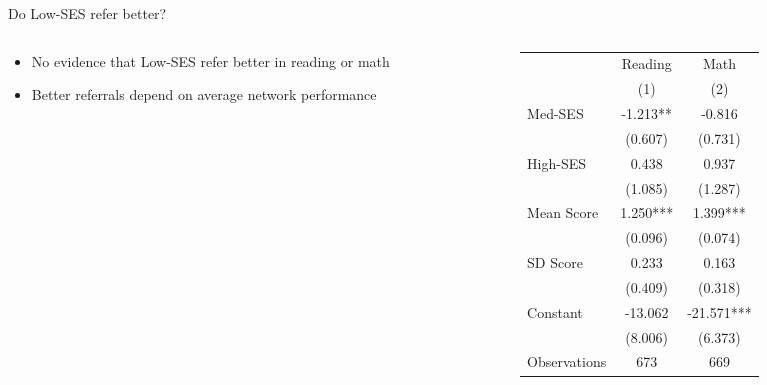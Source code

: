 \documentclass[aspectratio=169,xcolor=dvipsnames]{beamer}
\begin{document}
\begin{frame}{Do Low-SES refer better?}
    \begin{columns}[T]
        \begin{column}{0.42\textwidth}
            \vspace{2em}
            \begin{itemize}
                \item No evidence that Low-SES refer better in reading or math
                \item Better referrals depend on average network performance
            \end{itemize}
        \end{column}
        \begin{column}{0.58\textwidth}
            \begin{table}
                \centering
                \footnotesize
                \begin{tabular}{lcc}
                \toprule
                 & \multicolumn{1}{c}{Reading} & \multicolumn{1}{c}{Math} \\
                 & \multicolumn{1}{c}{(1)} & \multicolumn{1}{c}{(2)} \\
                \midrule
                Med-SES & -1.213** & -0.816 \\
                 & (0.607) & (0.731) \\
                High-SES & 0.438 & 0.937 \\
                 & (1.085) & (1.287) \\
                Mean Score & 1.250*** & 1.399*** \\
                 & (0.096) & (0.074) \\
                SD Score & 0.233 & 0.163 \\
                 & (0.409) & (0.318) \\
                Constant & -13.062 & -21.571*** \\
                 & (8.006) & (6.373) \\
                \midrule
                Observations & 673 & 669 \\
                \bottomrule
                \end{tabular}
            \end{table}
        \end{column}
    \end{columns}
\end{frame}
\end{document}
